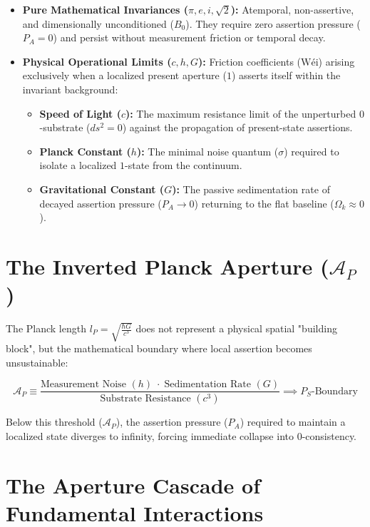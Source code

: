 \documentclass[11pt,a4paper]{article}
\begin{document}
\begin{itemize}
    \item \textbf{Pure Mathematical Invariances ($\pi, e, i, \sqrt{2}$):} Atemporal, non-assertive, and dimensionally unconditioned ($B_0$). They require zero assertion pressure ($P_A = 0$) and persist without measurement friction or temporal decay.
    \item \textbf{Physical Operational Limits ($c, h, G$):} Friction coefficients ($\text{Wéi}$) arising exclusively when a localized present aperture ($1$) asserts itself within the invariant background:
    \begin{itemize}
        \item \textbf{Speed of Light ($c$):} The maximum resistance limit of the unperturbed $0$-substrate ($ds^2 = 0$) against the propagation of present-state assertions.
        \item \textbf{Planck Constant ($h$):} The minimal noise quantum ($\sigma$) required to isolate a localized $1$-state from the continuum.
        \item \textbf{Gravitational Constant ($G$):} The passive sedimentation rate of decayed assertion pressure ($P_A \to 0$) returning to the flat baseline ($\Omega_k \approx 0$).
    \end{itemize}
\end{itemize}

\section{The Inverted Planck Aperture (\texorpdfstring{$\mathcal{A}_P$}{A\_P})}
The Planck length $l_P = \sqrt{\frac{\hbar G}{c^3}}$ does not represent a physical spatial "building block", but the mathematical boundary where local assertion becomes unsustainable:

\begin{equation}
\mathcal{A}_P \equiv \frac{\text{Measurement Noise } (h) \;\cdot\; \text{Sedimentation Rate } (G)}{\text{Substrate Resistance } (c^3)} \implies P_S \text{-Boundary}
\end{equation}

Below this threshold ($\mathcal{A}_P$), the assertion pressure ($P_A$) required to maintain a localized state diverges to infinity, forcing immediate collapse into $0$-consistency.

\section{The Aperture Cascade of Fundamental Interactions}
\end{document}
